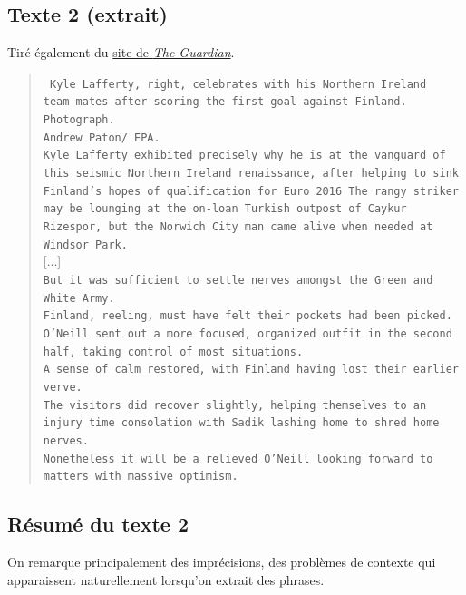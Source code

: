 \documentclass[a4paper, 12pt]{article}
\begin{document}
\subsection{Texte 2 (extrait)}

Tiré également du \href{http://www.theguardian.com/football/2015/mar/29/northern-ireland-finland-euro-2016-qualifier-match-report}{site de \textit{The Guardian}}.

\begin{quotation}
 \texttt{
 Kyle Lafferty,  right,  celebrates with his Northern Ireland team-mates after scoring the first goal against Finland. \\
Photograph. \\
Andrew Paton/ EPA. \\
Kyle Lafferty exhibited precisely why he is at the vanguard of this seismic Northern Ireland renaissance,  after helping to sink Finland’s hopes of qualification for Euro 2016
The rangy striker may be lounging at the on-loan Turkish outpost of Caykur Rizespor,  but the Norwich City man came alive when needed at Windsor Park. \\
}
[...]\\
\texttt{But it was sufficient to settle nerves amongst the Green and White Army. \\
Finland,  reeling,  must have felt their pockets had been picked. \\
O’Neill sent out a more focused,  organized outfit in the second half,  taking control of most situations. \\
A sense of calm restored,  with Finland having lost their earlier verve. \\
The visitors did recover slightly,  helping themselves to an injury time consolation with Sadik lashing home to shred home nerves. \\
Nonetheless it will be a relieved O’Neill looking forward to matters with massive optimism.
}
\end{quotation}

\subsection{Résumé du texte 2}

On remarque principalement des imprécisions, des problèmes de contexte qui apparaissent naturellement lorsqu'on extrait des phrases.
\end{document}
